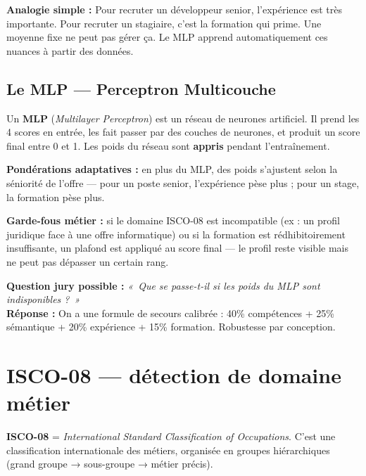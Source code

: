 \documentclass[12pt,a4paper]{article}
\newenvironment{simplification}{%
  \def\FrameCommand{\fboxsep=8pt\colorbox{green!10}}%
  \MakeFramed{\advance\hsize-\width \FrameRestore}%
  \vspace{-4pt}%
}{\endMakeFramed}
\newenvironment{jury}{%
  \def\FrameCommand{\fboxsep=8pt\colorbox{orange!12}}%
  \MakeFramed{\advance\hsize-\width \FrameRestore}%
  \vspace{-4pt}%
}{\endMakeFramed}
\newcommand{\concept}[1]{\textbf{\color{bleu}#1}}
\begin{document}
\begin{simplification}
\textbf{Analogie simple :}
Pour recruter un développeur senior, l'expérience est très importante. Pour recruter un stagiaire, c'est la formation qui prime. Une moyenne fixe ne peut pas gérer ça. Le MLP apprend automatiquement ces nuances à partir des données.
\end{simplification}

\subsection{Le MLP — Perceptron Multicouche}

Un \concept{MLP} (\textit{Multilayer Perceptron}) est un réseau de neurones artificiel. Il prend les 4 scores en entrée, les fait passer par des couches de neurones, et produit un score final entre 0 et 1. Les poids du réseau sont \textbf{appris} pendant l'entraînement.

\textbf{Pondérations adaptatives :} en plus du MLP, des poids s'ajustent selon la séniorité de l'offre — pour un poste senior, l'expérience pèse plus ; pour un stage, la formation pèse plus.

\textbf{Garde-fous métier :} si le domaine ISCO-08 est incompatible (ex : un profil juridique face à une offre informatique) ou si la formation est rédhibitoirement insuffisante, un plafond est appliqué au score final — le profil reste visible mais ne peut pas dépasser un certain rang.

\begin{jury}
\textbf{Question jury possible :} \textit{«~Que se passe-t-il si les poids du MLP sont indisponibles ?~»}\\[4pt]
\textbf{Réponse :} On a une formule de secours calibrée : 40\% compétences + 25\% sémantique + 20\% expérience + 15\% formation. Robustesse par conception.
\end{jury}

\newpage

\section{ISCO-08 — détection de domaine métier}

\concept{ISCO-08} = \textit{International Standard Classification of Occupations}. C'est une classification internationale des métiers, organisée en groupes hiérarchiques (grand groupe → sous-groupe → métier précis).
\end{document}
